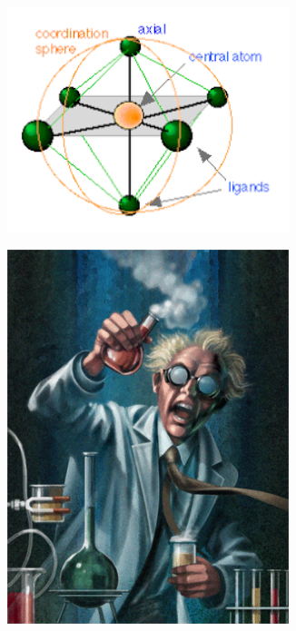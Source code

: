 \documentclass[a4paper]{memoir}
\begin{document}
\begin{figure}
\begin{subfigure}[t]{0.45\textwidth}
    \includegraphics[width=0.9\textwidth]{chem3}
  \end{subfigure}%
  \begin{subfigure}[t]{0.45\textwidth}
    \centering
    \includegraphics[width=0.9\textwidth]{chem4}
  \end{subfigure}\\

\end{figure}
\end{document}
